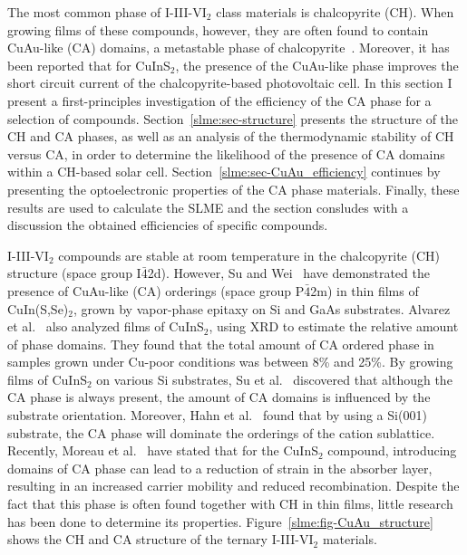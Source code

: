 \begin{refsection}
The most common phase of I-III-VI$_2$ class materials is chalcopyrite (CH). When 
growing films of these compounds, however, they are often found to contain 
CuAu-like (CA) domains, a metastable phase of chalcopyrite~\cite{Su1999}. Moreover, it has been 
reported that for CuInS$_2$, the presence of the CuAu-like phase improves the 
short circuit current of the chalcopyrite-based photovoltaic cell. In this 
section I present a first-principles investigation of the efficiency of the CA 
phase for a selection of compounds. Section~\ref{slme:sec-structure} presents 
the structure of the CH and CA phases, as well as an analysis of the thermodynamic 
stability of CH versus CA, in order to determine the likelihood of the presence of CA domains 
within a CH-based solar cell. Section~\ref{slme:sec-CuAu_efficiency} continues by presenting the optoelectronic 
properties of the CA phase materials. Finally, these results are used to calculate 
the SLME and the section consludes with a discussion the obtained efficiencies of specific compounds.  
 
 
I-III-VI$_2$ compounds are stable at room temperature in the chalcopyrite (CH) 
structure (space group I$\bar{4}$2d). However, Su and Wei~\cite{Su1999} have 
demonstrated the presence of CuAu-like (CA) orderings (space group 
P$\bar{4}$2m) in thin films of CuIn(S,Se)$_2$, grown by vapor-phase epitaxy on 
Si and GaAs substrates.  Alvarez et al.~\cite{Alvarez2002} also analyzed films 
of CuInS$_2$, using XRD to estimate the relative amount of phase domains. They 
found that the total amount of CA ordered phase in samples grown under Cu-poor 
conditions was between 8\% and 25\%. By growing films of CuInS$_2$ on various 
Si substrates, Su et al.~\cite{Su2000} discovered that although the CA phase 
is always present, the amount of CA domains is influenced by the substrate 
orientation. Moreover, Hahn et al.~\cite{Hahn2001} found that by using a 
Si(001) substrate, the CA phase will dominate the orderings of the cation 
sublattice. Recently, Moreau et al.~\cite{Moreau2015} have stated that for the 
CuInS$_2$ compound, introducing domains of CA phase can lead to a reduction of 
strain in the absorber layer, resulting in an increased carrier mobility and 
reduced recombination. Despite the fact that this phase is often found 
together with CH in thin films, little research has been done to determine its 
properties. Figure~\ref{slme:fig-CuAu_structure} shows the CH and CA structure 
of the ternary I-III-VI$_2$ materials. 
 

\end{refsection}
